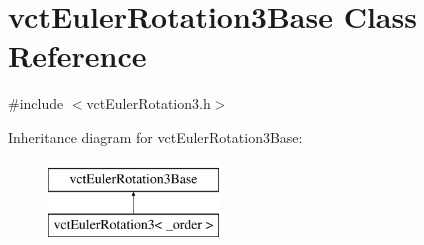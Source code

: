 \hypertarget{classvct_euler_rotation3_base}{\section{vct\-Euler\-Rotation3\-Base Class Reference}
\label{classvct_euler_rotation3_base}
}


{\ttfamily \#include $<$vct\-Euler\-Rotation3.\-h$>$}

Inheritance diagram for vct\-Euler\-Rotation3\-Base\-:\begin{figure}[H]
\begin{center}
\leavevmode
\includegraphics[height=2.000000cm]{de/d73/classvct_euler_rotation3_base}
\end{center}
\end{figure}
